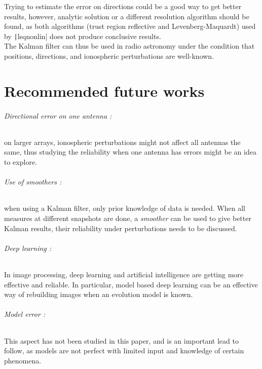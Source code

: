 \documentclass[titlepage,11pt]{article}
\begin{document}
	Trying to estimate the error on directions could be a good way to get better results, however, analytic solution or a different resolution algorithm should be found, as both algorithms (trust region reflective and Levenberg-Maquardt) used by \texttt|lsqnonlin| does not produce conclusive results. \\
	
	The Kalman filter can thus be used in radio astronomy under the condition that positions, directions, and ionospheric perturbations are well-known.

	\newpage
	\part{Recommended future works}
	
	
	\paragraph{Directional error on one antenna :} on larger arrays, ionospheric perturbations might not affect all antennas the same, thus studying the reliability when one antenna has errors might be an idea to explore.
	
	\paragraph{Use of smoothers :} when using a Kalman filter, only prior knowledge of data is needed. When all measures at different snapshots are done, a \emph{smoother}\cite{RTS} can be used to give better Kalman results, their reliability under perturbations needs to be discussed. 
	
	\paragraph{Deep learning :} In image processing, deep learning and artificial intelligence are getting more effective and reliable. In particular, model based deep learning \cite{deep} can be an effective way of rebuilding images when an evolution model is known.
	
	\paragraph{Model error :} This aspect has not been studied in this paper, and is an important lead to follow, as models are not perfect with limited input and knowledge of certain phenomena.
	
\end{document}
